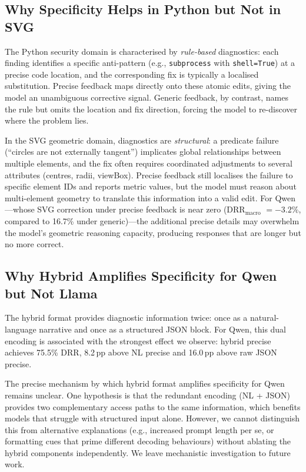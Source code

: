 \subsection{Why Specificity Helps in Python but Not in SVG}

The Python security domain is characterised by \emph{rule-based} diagnostics: each finding identifies a specific anti-pattern (e.g., \texttt{subprocess} with \texttt{shell=True}) at a precise code location, and the corresponding fix is typically a localised substitution. Precise feedback maps directly onto these atomic edits, giving the model an unambiguous corrective signal. Generic feedback, by contrast, names the rule but omits the location and fix direction, forcing the model to re-discover where the problem lies.

In the SVG geometric domain, diagnostics are \emph{structural}: a predicate failure (``circles are not externally tangent'') implicates global relationships between multiple elements, and the fix often requires coordinated adjustments to several attributes (centres, radii, viewBox). Precise feedback still localises the failure to specific element IDs and reports metric values, but the model must reason about multi-element geometry to translate this information into a valid edit. For Qwen---whose SVG correction under precise feedback is near zero (DRR$_\text{macro}$ $= -3.2$\%, compared to 16.7\% under generic)---the additional precise details may overwhelm the model's geometric reasoning capacity, producing responses that are longer but no more correct.

\subsection{Why Hybrid Amplifies Specificity for Qwen but Not Llama}

The hybrid format provides diagnostic information twice: once as a natural-language narrative and once as a structured JSON block. For Qwen, this dual encoding is associated with the strongest effect we observe: hybrid precise achieves 75.5\% DRR, 8.2\,pp above NL precise and 16.0\,pp above raw JSON precise.

The precise mechanism by which hybrid format amplifies specificity for Qwen remains unclear. One hypothesis is that the redundant encoding (NL + JSON) provides two complementary access paths to the same information, which benefits models that struggle with structured input alone. However, we cannot distinguish this from alternative explanations (e.g., increased prompt length per se, or formatting cues that prime different decoding behaviours) without ablating the hybrid components independently. We leave mechanistic investigation to future work.


